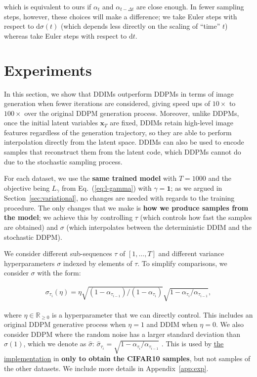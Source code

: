 which is equivalent to ours if $\alpha_t$ and $\alpha_{t-\Delta t}$ are close enough. In fewer sampling steps, however, these choices will make a difference; we take Euler steps with respect to $\mathrm{d} \sigma(t)$ (which depends less directly on the scaling of ``time'' $t$) whereas \citet{song2020score} take Euler steps with respect to $\mathrm{d} t$.

\section{Experiments}
\label{sec:experiments}

In this section, we show that DDIMs outperform DDPMs in terms of image generation when fewer iterations are considered, giving speed ups of $10\times$ to $100\times$ over the original DDPM generation process. Moreover, unlike DDPMs, once the initial latent variables ${\bm{x}}_T$ are fixed, DDIMs retain high-level image features regardless of the generation trajectory, so they are able to perform interpolation directly from the latent space. DDIMs can also be used to encode samples that reconstruct them from the latent code, which DDPMs cannot do due to the stochastic sampling process.

For each dataset, we use the \textbf{same trained model} with $T = 1000$ and the objective being $L_\gamma$ from Eq.~(\ref{eq:l-gamma}) with $\gamma = {\bm{1}}$; as we argued in Section~\ref{sec:variational}, no changes are needed with regards to the training procedure. The only changes that we make is \textbf{how we produce samples from the model}; we achieve this by controlling $\tau$ (which controls how fast the samples are obtained) and $\sigma$ (which interpolates between the deterministic DDIM and the stochastic DDPM).

We consider different sub-sequences $\tau$ of $[1, \ldots, T]$ and different variance hyperparameters $\sigma$ indexed by elements of $\tau$. To simplify comparisons, we consider $\sigma$ with the form:

\begin{align}
    \sigma_{\tau_{i}}(\eta) = \eta \sqrt{(1 - \alpha_{\tau_{i-1}})/(1 - \alpha_{\tau_{i}})}\sqrt{1 - {\alpha_{\tau_i}}/{\alpha_{\tau_{i-1}}}}, 
\end{align}

where $\eta \in \mathbb{R}_{\geq 0}$ is a hyperparameter that we can directly control. This includes an original DDPM generative process when $\eta = 1$ and DDIM when $\eta = 0$. We also consider DDPM where the random noise has a larger standard deviation than $\sigma(1)$, which we denote as $\hat{\sigma}$:
$
    \hat{\sigma}_{\tau_{i}} = \sqrt{1 - {\alpha_{\tau_i}}/{\alpha_{\tau_{i-1}}}}
$
. This is used by \href{https://github.com/hojonathanho/diffusion/blob/master/scripts/run_cifar.py#L136}{\underline{the implementation}} in \cite{ho2020denoising} \textbf{only to obtain the CIFAR10 samples}, but not samples of the other datasets. We include more details in Appendix~\ref{app:exp}. 

